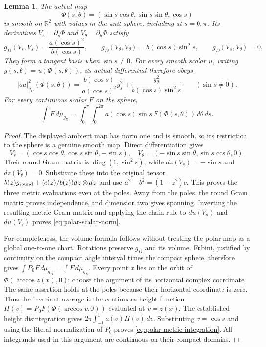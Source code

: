 \documentclass[11pt]{article}
\newtheorem{lemma}[theorem]{Lemma}
\newcommand{\R}{\mathbb R}
\begin{document}
\begin{lemma}\label{lem:polar-scalar-geometry}
The actual map
\[
 \Phi(s,\theta)=(\sin s\cos\theta,\sin s\sin\theta,\cos s)
\]
is smooth on $\R^2$ with values in the unit sphere, including at $s=0,\pi$.
Its derivatives $V_s=\partial_s\Phi$ and $V_\theta=\partial_\theta\Phi$ satisfy
\[
 g_D(V_s,V_s)=\frac{a(\cos s)^2}{b(\cos s)},\qquad
 g_D(V_\theta,V_\theta)=b(\cos s)\sin^2s,\qquad
 g_D(V_s,V_\theta)=0.
\]
They form a tangent basis when $\sin s\ne0$. For every smooth scalar $u$, writing
$y(s,\theta)=u(\Phi(s,\theta))$, its actual differential therefore obeys
\begin{equation}\label{eq:polar-scalar-norm}
 |du|_{g_D}^2(\Phi(s,\theta))
 =\frac{b(\cos s)}{a(\cos s)^2}y_s^2
       +\frac{y_\theta^2}{b(\cos s)\sin^2s}
 \qquad(\sin s\ne0).
\end{equation}
For every continuous scalar $F$ on the sphere,
\begin{equation}\label{eq:polar-metric-integration}
 \int F\,d\mu_{g_D}
   =\int_0^\pi\int_0^{2\pi}
       a(\cos s)\sin s\,F(\Phi(s,\theta))\,d\theta\,ds.
\end{equation}
\end{lemma}

\begin{proof}
The displayed ambient map has norm one and is smooth, so its restriction to
the sphere is a genuine smooth map. Direct differentiation gives
\[
 V_s=(\cos s\cos\theta,\cos s\sin\theta,-\sin s),\quad
 V_\theta=(-\sin s\sin\theta,\sin s\cos\theta,0).
\]
Their round Gram matrix is $\operatorname{diag}(1,\sin^2s)$, while
$dz(V_s)=-\sin s$ and $dz(V_\theta)=0$. Substitute these into the original
tensor $b(z)g_{\rm round}+(c(z)/b(z))dz\otimes dz$ and use
$a^2-b^2=(1-z^2)c$. This proves the three metric evaluations even at the poles.
Away from the poles, the round Gram matrix proves independence, and dimension
two gives spanning. Inverting the resulting metric Gram matrix and applying
the chain rule to $du(V_s)$ and $du(V_\theta)$ proves
\eqref{eq:polar-scalar-norm}.

For completeness, the volume formula follows without treating the polar map
as a global one-to-one chart. Rotations preserve $g_D$ and its volume. Fubini,
justified by continuity on the compact angle interval times the compact sphere,
therefore gives $\int P_0F\,d\mu_{g_D}=\int F\,d\mu_{g_D}$.
Every point $x$ lies on the orbit of $\Phi(\arccos z(x),0)$: choose the argument
of its horizontal complex coordinate. The same assertion holds at the poles
because their horizontal coordinate is zero. Thus the invariant average is
the continuous height function
$H(v)=P_0F(\Phi(\arccos v,0))$ evaluated at $v=z(x)$.
The established height disintegration gives $2\pi\int_{-1}^1 a(v)H(v)\,dv$.
Substituting $v=\cos s$ and using the literal normalization of $P_0$ proves
\eqref{eq:polar-metric-integration}. All integrands used in this argument are
continuous on their compact domains.
\end{proof}
\end{document}
